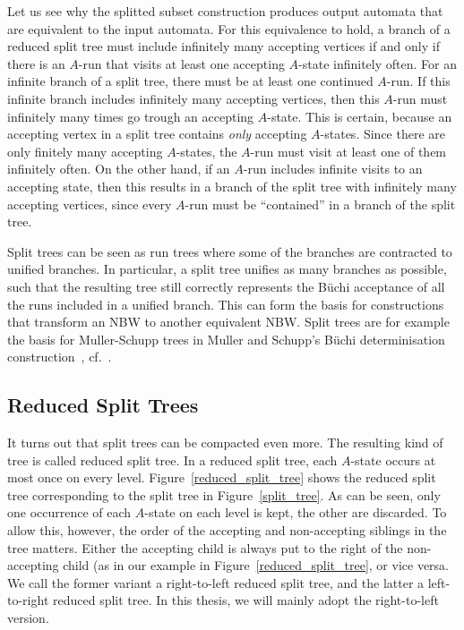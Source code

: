 Let us see why the splitted subset construction produces output automata that are equivalent to the input automata. For this equivalence to hold, a branch of a reduced split tree must include infinitely many accepting vertices if and only if there is an $A$-run that visits at least one accepting $A$-state infinitely often. For an infinite branch of a split tree, there must be at least one continued $A$-run. If this infinite branch includes infinitely many accepting vertices, then this $A$-run must infinitely many times go trough an accepting $A$-state. This is certain, because an accepting vertex in a split tree contains \emph{only} accepting $A$-states. Since there are only finitely many accepting $A$-states, the $A$-run must visit at least one of them infinitely often. On the other hand, if an $A$-run includes infinite visits to an accepting state, then this results in a branch of the split tree with infinitely many accepting vertices, since every $A$-run must be ``contained'' in a branch of the split tree.

Split trees can be seen as run trees where some of the branches are contracted to unified branches. In particular, a split tree unifies as many branches as possible, such that the resulting tree still correctly represents the Büchi acceptance of all the runs included in a unified branch. This can form the basis for constructions that transform an NBW to another equivalent NBW. Split trees are for example the basis for Muller-Schupp trees in Muller and Schupp's Büchi determinisation construction~\cite{Muller199569}, cf.~\cite{2006_althoff}.

\subsection{Reduced Split Trees}

It turns out that split trees can be compacted even more. The resulting kind of tree is called reduced split tree. In a reduced split tree, each $A$-state occurs at most once on every level. Figure~\ref{reduced_split_tree} shows the reduced split tree corresponding to the split tree in Figure~\ref{split_tree}. As can be seen, only one occurrence of each $A$-state on each level is kept, the other are discarded. To allow this, however, the order of the accepting and non-accepting siblings in the tree matters. Either the accepting child is always put to the right of the non-accepting child (as in our example in Figure~\ref{reduced_split_tree}, or vice versa. We call the former variant a right-to-left reduced split tree, and the latter a left-to-right reduced split tree. In this thesis, we will mainly adopt the right-to-left version.

